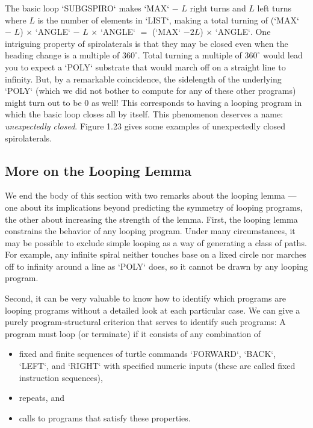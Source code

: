 \documentclass{book}
\begin{document}
The basic loop \textsc{`SUBGSPIRO`} makes \textsc{`MAX`} $-$ $L$ right turns and $L$ left turns
where $L$ is the number of elements in \textsc{`LIST`}, making a total turning of
(\textsc{`MAX`} $-$ $L$) $\times$ \textsc{`ANGLE`} $-$ $L$ $\times$ \textsc{`ANGLE`} $=$ (\textsc{`MAX`} $- 2L$) $\times$ \textsc{`ANGLE`}.
One intriguing property of spirolaterals is that they may be closed even
when the heading change is a multiple of $360^{\circ}$. Total turning a multiple
of $360^{\circ}$ would lead you to expect a \textsc{`POLY`} substrate that would march
off on a straight line to infinity. But, by a remarkable coincidence, the
sidelength of the underlying \textsc{`POLY`} (which we did not bother to compute
for any of these other programs) might turn out to be 0 as well! This
corresponds to having a looping program in which the basic loop closes
all by itself. This phenomenon deserves a name: {\em unexpectedly closed}. Figure 1.23 gives some examples of unexpectedly closed spirolaterals.

\subsection{More on the Looping Lemma}

We end the body of this section with two remarks about the looping
lemma --- one about its implications beyond predicting the symmetry of
looping programs, the other about increasing the strength of the lemma.
First, the looping lemma constrains the behavior of any looping program. Under many circumstances, it may be possible to exclude simple
looping as a way of generating a class of paths. For example, any infinite
spiral neither touches base on a lixed circle nor marches off to infinity
around a line as \textsc{`POLY`} does, so it cannot be drawn by any looping program.

Second, it can be very valuable to know how to identify which programs are looping programs without a detailed look at each particular
case. We can give a purely program-structural criterion that serves to
identify such programs: A program must loop (or terminate) if it consists
of any combination of

\begin{itemize}
\item fixed and finite sequences of turtle commands \textsc{`FORWARD`}, \textsc{`BACK`}, \textsc{`LEFT`},
and \textsc{`RIGHT`} with specified numeric inputs (these are called fixed instruction sequences),
\item repeats, and
\item calls to programs that satisfy these properties.
\end{itemize}
\end{document}
